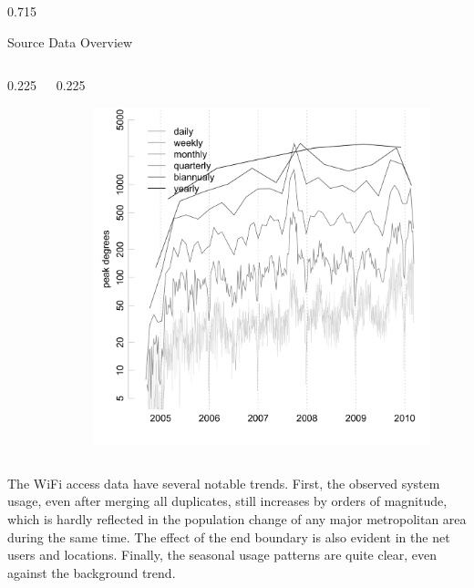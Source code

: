 \documentclass[final]{beamer} %
\newcommand{\spaceProp}{0.02}
\newcommand{\spacer}{\begin{column}{\spaceProp\paperwidth}\end{column}}
\newenvironment{oneCol}{\begin{column}[t]{0.225\paperwidth}}{\end{column}}
\newenvironment{threeCol}{\begin{column}[t]{0.715\paperwidth}}{\end{column}}
\begin{document}
\begin{frame}{}
\begin{columns}[t]
\begin{threeCol}
\begin{block}{Source Data Overview}
\begin{columns}
\begin{oneCol}
\begin{figure}
      \end{figure}   
    \end{oneCol}
    \begin{oneCol}
      \begin{figure}
        \includegraphics[width=1.0\linewidth]{maxEdges.png}
      \end{figure}   
    \end{oneCol}
    \end{columns}
    The WiFi access data have several notable trends.  First, the observed system usage, even after merging all duplicates, still increases by orders of magnitude, which is hardly reflected in the population change of any major metropolitan area during the same time.  The effect of the end boundary is also evident in the net users and locations.  Finally, the seasonal usage patterns are quite clear, even against the background trend. 
    \end{block}
    

\end{threeCol}
\end{columns}
\end{frame}
\end{document}
